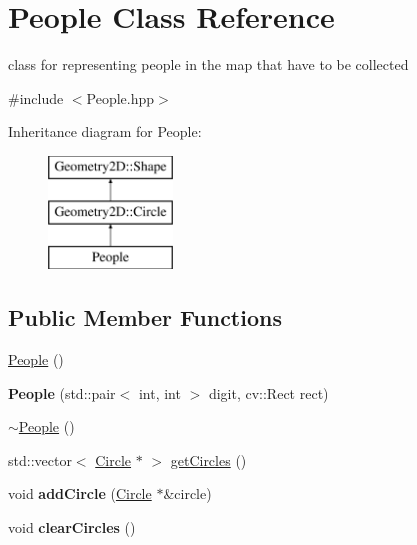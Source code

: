 \hypertarget{class_people}{}\section{People Class Reference}
\label{class_people}


class for representing people in the map that have to be collected  




{\ttfamily \#include $<$People.\+hpp$>$}

Inheritance diagram for People\+:\begin{figure}[H]
\begin{center}
\leavevmode
\includegraphics[height=3.000000cm]{class_people}
\end{center}
\end{figure}
\subsection*{Public Member Functions}
\begin{DoxyCompactItemize}
\item 
\mbox{\hyperlink{class_people_aae1408eddfd15a5007003ecdf1507941}{People}} ()
\item 
\mbox{\label{class_people_abfabd2f2e27a7aa269d404e8f27f903e}} 
{\bfseries People} (std\+::pair$<$ int, int $>$ digit, cv\+::\+Rect rect)
\item 
\mbox{\hyperlink{class_people_adae124857f64dadff4e1801410b3dab2}{$\sim$\+People}} ()
\item 
std\+::vector$<$ \mbox{\hyperlink{class_geometry2_d_1_1_circle}{Circle}} $\ast$ $>$ \mbox{\hyperlink{class_people_a55604e9d3aa4a772b5d8d97ead9493b0}{get\+Circles}} ()
\item 
\mbox{\label{class_people_a91265f0ac62bb76a6c3995d9228de33f}} 
void {\bfseries add\+Circle} (\mbox{\hyperlink{class_geometry2_d_1_1_circle}{Circle}} $\ast$\&circle)
\item 
\mbox{\label{class_people_a794c9fff88edec5c1de67cc86950ce52}} 
void {\bfseries clear\+Circles} ()
\end{DoxyCompactItemize}
